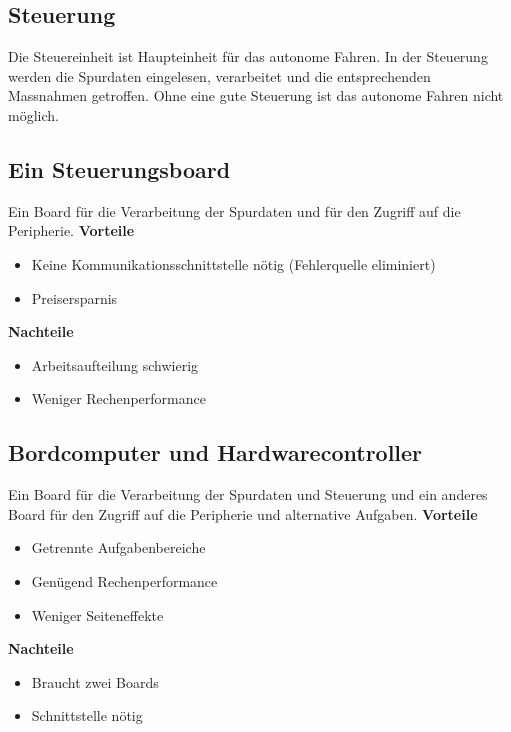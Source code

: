 
\subsection{Steuerung}
Die Steuereinheit ist Haupteinheit für das autonome Fahren. In der Steuerung werden die Spurdaten eingelesen, verarbeitet und die entsprechenden Massnahmen getroffen. Ohne eine gute Steuerung ist das autonome Fahren nicht möglich. 
\subsection{Ein Steuerungsboard}
Ein Board für die Verarbeitung der Spurdaten und für den Zugriff auf die Peripherie.
\textbf {Vorteile}
\begin{itemize}
\item Keine Kommunikationsschnittstelle nötig (Fehlerquelle eliminiert)
\item Preisersparnis\\
\end{itemize}
\textbf {Nachteile}
\begin{itemize}
\item Arbeitsaufteilung schwierig
\item Weniger Rechenperformance
\end{itemize}

\subsection{Bordcomputer und Hardwarecontroller}
Ein Board für die Verarbeitung der Spurdaten und Steuerung und ein anderes Board für den Zugriff auf die Peripherie und alternative Aufgaben.
\textbf {Vorteile}
\begin{itemize}
\item Getrennte Aufgabenbereiche 
\item Genügend Rechenperformance
\item Weniger Seiteneffekte\\
\end{itemize}
\textbf {Nachteile}
\begin{itemize}
\item Braucht zwei Boards
\item Schnittstelle nötig
\end{itemize}